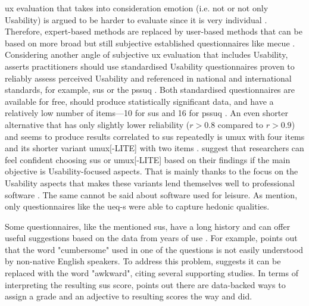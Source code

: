 \gls{ux} evaluation that takes into consideration emotion (i.e. not or not only Usability) is argued to be harder to evaluate since it is very individual \parencite{Juergen_et_all_2020}.
Therefore, expert-based methods are replaced by user-based methods that can be based on more broad but still subjective established questionnaires like \gls{mecue} \parencite{Juergen_et_all_2020}.
Considering another angle of subjective \gls{ux} evaluation that includes Usability, \textcite{Lewis_2014} asserts practitioners should use standardised Usability questionnaires proven to reliably assess perceived Usability and referenced in national and international standards, for example, \gls{sus} \parencite{Lewis_2018} or the \gls{pssuq} \parencite{Lewis_1995, Lewis_2002}.
Both standardised questionnaires are available for free, should produce statistically significant data, and have a relatively low number of items---10 for \gls{sus} and 16 for \gls{pssuq} \parencite{Lewis_2014}.
An even shorter alternative that has only slightly lower reliability ($r>0.8$ compared to $r>0.9$) and seems to produce results correlated to \gls{sus} repeatedly is \gls{umux} with four items and its shorter variant \gls{umux}[-LITE] with two items \parencite{Lewis_2014,Lewis_2018}.
\textcite{Schrepp_Kollmorge_Thomaschewski_2023} suggest that researchers can feel confident choosing \gls{sus} or \gls{umux}[-LITE] based on their findings if the main objective is Usability-focused aspects.
That is mainly thanks to the focus on the Usability aspects that makes these variants lend themselves well to professional software \parencite{Schrepp_Kollmorge_Thomaschewski_2023}.
The same cannot be said about software used for leisure.
As \textcite{Schrepp_Kollmorge_Thomaschewski_2023} mention, only questionnaires like the \gls{ueq-s} were able to capture hedonic qualities.

\label{sec:sus-evaluation}

Some questionnaires, like the mentioned \gls{sus}, have a long history and can offer useful suggestions based on the data from years of use \parencite{brooke_2013}.
For example, \textcite[p. 35]{brooke_2013} points out that the word "cumbersome" used in one of the questions is not easily understood by non-native English speakers.
To address this problem, \textcite[p. 35]{brooke_2013} suggests it can be replaced with the word "awkward", citing several supporting studies.
In terms of interpreting the resulting \gls{sus} score, \textcite[pp. 36-37]{brooke_2013} points out there are data-backed ways to assign a grade and an adjective to resulting scores the way \textcite{bangor_determining_2009} and \textcite{sauro_practical_2011} did.

